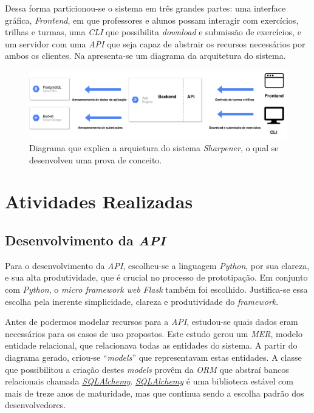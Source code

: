 Dessa forma particionou-se o sistema em três grandes partes: uma interface gráfica, \emph{Frontend}, 
em que professores e alunos possam interagir com exercícios, trilhas e turmas, uma \emph{CLI} que possibilita 
\emph{download} e submissão de exercícios, e um servidor com uma \emph{API} que seja capaz de abstrair 
os recursos necessários por ambos os clientes. Na  apresenta-se um diagrama 
da arquitetura do sistema.

  \begin{figure}[htpb]
    \centering
    \includegraphics[width=0.95\linewidth]{images/arquitetura.pdf}
    \caption{Diagrama que explica a arquietura do sistema \emph{Sharpener}, o qual 
    se desenvolveu uma prova de conceito.}%
    \label{fig:arquitetura}
  \end{figure}



\section{Atividades Realizadas}
\subsection{Desenvolvimento da \emph{API}}
Para o desenvolvimento da \emph{API}, escolheu-se a linguagem \emph{Python}, por sua clareza, 
e sua alta produtividade, que é crucial no processo de prototipação. Em conjunto com \emph{Python}, 
o \emph{micro framework web} \emph{Flask} também foi escolhido. Justifica-se essa escolha pela
inerente simplicidade, clareza e produtividade do \emph{framework}. 

Antes de podermos modelar recursos para a \emph{API},
estudou-se quais dados eram necessários para os casos de uso propostos. Este estudo gerou um 
\emph{MER}, modelo entidade relacional, que relacionava todas as entidades do sistema. A partir 
do diagrama gerado, criou-se ``\emph{models}'' que representavam estas entidades. A classe 
que possibilitou a criação destes \emph{models} provêm da \emph{ORM} que abstraí bancos 
relacionais chamada \hyperref[link:sql_alchemy]{\emph{SQLAlchemy}}. \hyperref[link:sql_alchemy]{\emph{SQLAlchemy}}
é uma biblioteca estável com mais de treze anos de maturidade,
mas que continua sendo a escolha padrão dos desenvolvedores.

